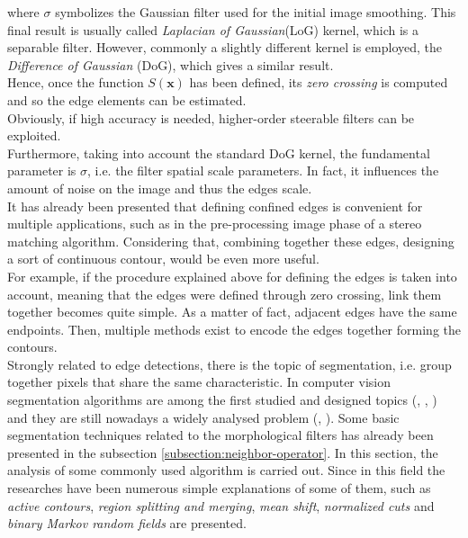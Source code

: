 where $\sigma$ symbolizes the Gaussian filter used for the initial image smoothing.
This final result is usually called \textit{Laplacian of Gaussian}(LoG) kernel, which is a separable filter.
However, commonly a slightly different kernel is employed, the \textit{Difference of Gaussian} (DoG), which gives a similar result.\\
Hence, once the function $S(\mathbf{x})$ has been defined, its \textit{zero crossing} is computed and so the edge elements can be estimated. \\
Obviously, if high accuracy is needed, higher-order steerable filters can be exploited.\\
Furthermore, taking into account the standard DoG kernel, the fundamental parameter is $\sigma$, i.e. the filter spatial scale parameters.
In fact, it influences the amount of noise on the image and thus the edges scale. \\
It has already been presented that defining confined edges is convenient for multiple applications, such as in the pre-processing image phase of a stereo matching algorithm.
Considering that, combining together these edges, designing a sort of continuous contour, would be even more useful.\\
For example, if the procedure explained above for defining the edges is taken into account, meaning that the edges were defined through zero crossing, link them together becomes quite simple. 
As a matter of fact, adjacent edges have the same endpoints. 
Then, multiple methods exist to encode the edges together forming the contours.\\
Strongly related to edge detections, there is the topic of segmentation, i.e. group together pixels that share the same characteristic.
In computer vision segmentation algorithms are among the first studied and designed topics (\cite{ohlander1978picture}, \cite{Brice1970}, \cite{haralick1985image}) and they are still nowadays a widely analysed problem (\cite{comaniciu2002mean}, \cite{cremers2007review}). 
Some basic segmentation techniques related to the morphological filters has already been presented in the subsection \ref{subsection:neighbor-operator}. 
In this section, the analysis of some commonly used algorithm is carried out.
Since in this field the researches have been numerous simple explanations of some of them, such as \textit{active contours}, \textit{region splitting and merging}, \textit{mean shift}, \textit{normalized cuts} and \textit{binary Markov random fields} are presented. \\

